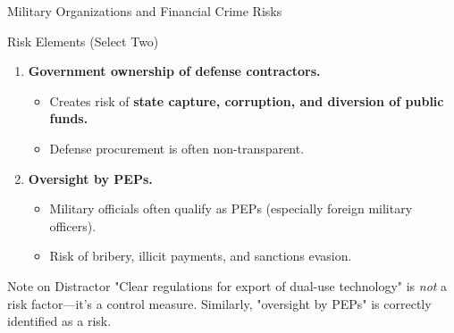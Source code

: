 \documentclass{beamer}
\begin{document}
	\begin{frame}{Military Organizations and Financial Crime Risks}
		\begin{block}{Risk Elements (Select Two)}
			\begin{enumerate}
				\item \textbf{Government ownership of defense contractors.}
				\begin{itemize}
					\item Creates risk of \textbf{state capture, corruption, and diversion of public funds.}
					\item Defense procurement is often non-transparent.
				\end{itemize}
				\item \textbf{Oversight by PEPs.}
				\begin{itemize}
					\item Military officials often qualify as PEPs (especially foreign military officers).
					\item Risk of bribery, illicit payments, and sanctions evasion.
				\end{itemize}
			\end{enumerate}
		\end{block}
		\begin{alertblock}{Note on Distractor}
			"Clear regulations for export of dual-use technology" is \textit{not} a risk factor—it's a control measure. Similarly, "oversight by PEPs" is correctly identified as a risk.
		\end{alertblock}
	\end{frame}
	
\end{document}
